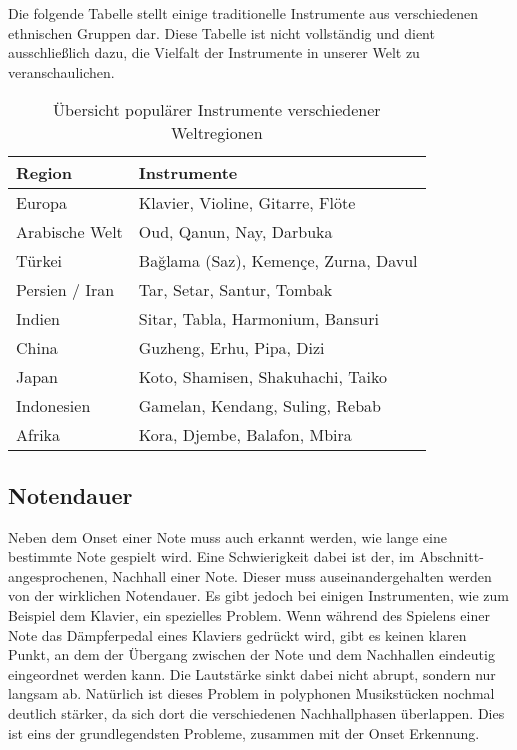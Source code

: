 Die folgende Tabelle stellt einige traditionelle Instrumente aus verschiedenen ethnischen Gruppen dar.
Diese Tabelle ist nicht vollständig und dient ausschließlich dazu,
die Vielfalt der Instrumente in unserer Welt zu veranschaulichen.
\begin{table}[H]
\centering
\begin{tabular}{|l|p{10cm}|}
\hline
\textbf{Region} & \textbf{Instrumente} \\ \hline
Europa & Klavier, Violine, Gitarre, Flöte \\ \hline
Arabische Welt & Oud, Qanun, Nay, Darbuka \\ \hline
Türkei & Bağlama (Saz), Kemençe, Zurna, Davul \\ \hline
Persien / Iran & Tar, Setar, Santur, Tombak \\ \hline
Indien & Sitar, Tabla, Harmonium, Bansuri \\ \hline
China & Guzheng, Erhu, Pipa, Dizi \\ \hline
Japan & Koto, Shamisen, Shakuhachi, Taiko \\ \hline
Indonesien & Gamelan, Kendang, Suling, Rebab \\ \hline
Afrika & Kora, Djembe, Balafon, Mbira \\ \hline
\end{tabular}
\caption{Übersicht populärer Instrumente verschiedener Weltregionen}
\end{table}

\subsection{Notendauer}
Neben dem Onset einer Note muss auch erkannt werden, wie lange eine bestimmte Note gespielt wird.
Eine Schwierigkeit dabei ist der, im Abschnitt- angesprochenen, Nachhall einer Note.
Dieser muss auseinandergehalten werden von der wirklichen Notendauer.
Es gibt jedoch bei einigen Instrumenten, wie zum Beispiel dem Klavier, ein spezielles Problem.
Wenn während des Spielens einer Note das Dämpferpedal eines Klaviers gedrückt wird, gibt es keinen klaren Punkt,
an dem der Übergang zwischen der Note und dem Nachhallen eindeutig eingeordnet werden kann.
Die Lautstärke sinkt dabei nicht abrupt, sondern nur langsam ab.
Natürlich ist dieses Problem in polyphonen Musikstücken nochmal deutlich stärker,
da sich dort die verschiedenen Nachhallphasen überlappen.
Dies ist eins der grundlegendsten Probleme, zusammen mit der Onset Erkennung.
\cite{jamshidi2024machine}

